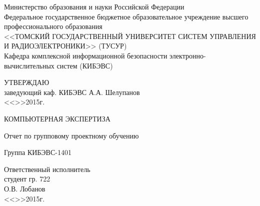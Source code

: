 \newpage
{}

\begin{center}
 Министерство образования и науки Российской Федерации\\
 Федеральное государственное бюджетное образовательное учреждение высшего профессионального образования\\
 <<ТОМСКИЙ ГОСУДАРСТВЕННЫЙ УНИВЕРСИТЕТ СИСТЕМ УПРАВЛЕНИЯ И РАДИОЭЛЕКТРОНИКИ>> (ТУСУР)\\
 Кафедра комплексной информационной безопасности электронно-вычислительных систем (КИБЭВС)\\
\end{center}

\vfill

\begin{flushright}
\begin{minipage}{0.45\textwidth}
 \begin{flushleft}
  УТВЕРЖДАЮ\\
  заведующий каф. КИБЭВС
  \underline{\hspace{3cm}}А.А. Шелупанов \\
  <<\underline{\hspace{1cm}}>>\underline{\hspace{3cm}}2015г.\\
 \end{flushleft}
\end{minipage}
\end{flushright}

\vfill

\begin{center}
КОМПЬЮТЕРНАЯ ЭКСПЕРТИЗА

Отчет по групповому проектному обучению

Группа КИБЭВС-1401
\end{center}

\vfill
\begin{flushright}
\begin{minipage}{0.45\textwidth}
 \begin{flushleft}
  Ответственный исполнитель \\
  студент гр. 722 \\
  \underline{\hspace{3cm}}О.В. Лобанов \\
  <<\underline{\hspace{1cm}}>>\underline{\hspace{3cm}}2015г.\\
 \end{flushleft}
\end{minipage}
\end{flushright}

